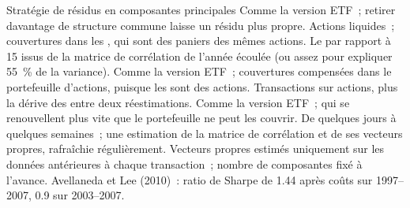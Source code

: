 \begin{strategyfile}{Stratégie de résidus en composantes principales}\label{strat:s1:residual-and-principal-component-stat-arb:pca}
 Comme la version ETF~; retirer davantage de structure commune laisse un résidu plus propre.
 Actions liquides~; couvertures dans les , qui sont des paniers des mêmes actions.
 Le  par rapport à 15  issus de la matrice de corrélation de l'année écoulée (ou assez pour expliquer 55~\% de la variance).
 Comme la version ETF~; couvertures compensées dans le portefeuille d'actions, puisque les  sont des actions.
 Transactions sur actions, plus la dérive des  entre deux réestimations.
 Comme la version ETF~;  qui se renouvellent plus vite que le portefeuille ne peut les couvrir.
 De quelques jours à quelques semaines~; une estimation de la matrice de corrélation et de ses vecteurs propres, rafraîchie régulièrement.
 Vecteurs propres estimés uniquement sur les données antérieures à chaque transaction~; nombre de composantes fixé à l'avance.
 Avellaneda et Lee (2010)~: ratio de Sharpe de 1.44 après coûts sur 1997--2007, 0.9 sur 2003--2007.
\end{strategyfile}


